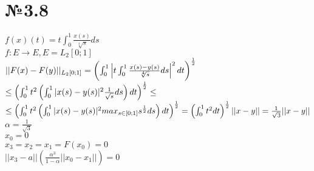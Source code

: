 \documentclass[oneside, final, 11pt]{article}
\begin{document}
\section{№3.8}
\begin{flushleft}
    $f(x)(t) = t \int_0^1 \frac{x(s)}{\sqrt[4]{s}} ds $\\
    $f: E \rightarrow E, E = L_2[0;1]$\\
    $||F(x)-F(y)||_{L_2[0;1]} = \left( \int_0^1 \left|t \int_0^1 \frac{x(s)-y(s)}{\sqrt[4]{s}} ds \right|^2 dt\right)^{1\over2}$ $\leq \left( \int_0^1 t^2 \left(\int_0^1 |x(s)-y(s)|^2 \frac{1}{\sqrt{s}} ds \right)dt\right)^{1\over2} \leq $\\
    $\leq \left( \int_0^1 t^2 \left(\int_0^1 |x(s)-y(s)|^2 {max}_{s\in[0;1]} s^{1\over2} ds \right)dt\right)^{1\over2} = \left(\int_0^1 t^2 dt \right)^{1\over2} ||x-y|| = \frac{1}{\sqrt{3}} ||x-y||$\\
    $\alpha = \frac{1}{\sqrt{3}} $\\
    $x_0 = 0 $\\
    $x_3=x_2=x_1=F(x_0) = 0$\\
    $||x_3 - a|| \left( \frac{\alpha^3}{1-\alpha}||x_0 - x_1|| \right) = 0$

\end{flushleft}
\end{document}
